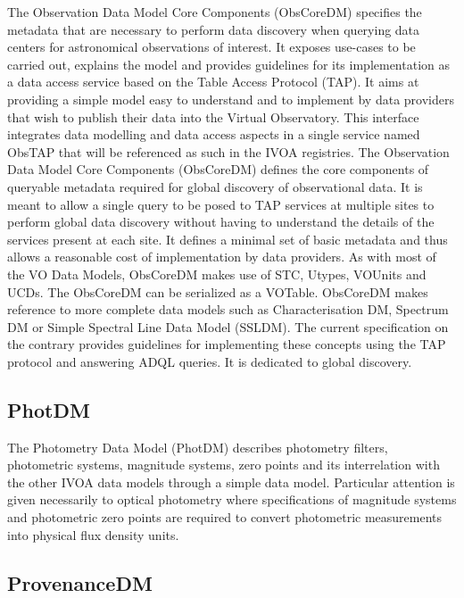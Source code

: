 \documentclass[11pt,letter]{ivoa}
\begin{document}
The Observation Data Model Core Components (ObsCoreDM) \citep{2017ivoa.spec.0509L} specifies the metadata that are necessary to perform data 
discovery when querying data centers for astronomical observations of interest. It exposes 
use-cases to be carried out, explains the model and provides guidelines for its implementation 
as a data access service based on the Table Access Protocol (TAP). It aims at providing a 
simple model easy to understand and to implement by data providers that wish to publish their 
data into the Virtual Observatory. This interface integrates data modelling and data access 
aspects in a single service named ObsTAP that will be referenced as such in the IVOA 
registries. The Observation Data Model Core Components (ObsCoreDM) defines 
the core components of queryable metadata required for global discovery of observational data.
It is meant to allow a single query to be posed to TAP services at multiple sites to perform 
global data discovery without having to understand the details of the services present at each 
site. It defines a minimal set of basic metadata and thus allows a reasonable cost of 
implementation by data providers. As with most of the VO Data Models, ObsCoreDM makes use of STC, Utypes, 
VOUnits and UCDs. The ObsCoreDM can be serialized as a VOTable. ObsCoreDM makes reference 
to more complete data models such as Characterisation DM, Spectrum DM or Simple Spectral Line 
Data Model (SSLDM). The current specification on the contrary provides guidelines for 
implementing these concepts using the TAP protocol and answering ADQL queries. It is 
dedicated to global discovery.

\subsection{PhotDM}

The Photometry Data Model (PhotDM) \citep{2022ivoa.spec.1101S} describes photometry filters, photometric systems, magnitude 
systems, zero points and its interrelation with the other IVOA data models through a 
simple data model. Particular attention is given necessarily to optical photometry where 
specifications of magnitude systems and photometric zero points are required to convert 
photometric measurements into physical flux density units.

\subsection{ProvenanceDM}
\end{document}
